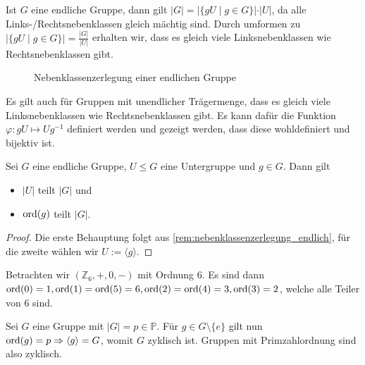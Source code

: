 \begin{remark}\label{rem:nebenklassenzerlegung_endlich}
    Ist $G$ eine endliche Gruppe, dann gilt $\vert G \vert = \vert \{gU \mid g \in G\} \vert \cdot \vert U \vert$, da alle Links-/Rechtsnebenklassen gleich mächtig sind. Durch umformen zu $\vert \{gU \mid g \in G\} \vert = \frac{\vert G \vert}{\vert U \vert}$ erhalten wir, dass es gleich viele Linksnebenklassen wie Rechtsnebenklassen gibt.

    \begin{figure}[H]
        \centering
        \caption{Nebenklassenzerlegung einer endlichen Gruppe}
    \end{figure}
\end{remark}

\begin{remark}
    Es gilt auch für Gruppen mit unendlicher Trägermenge, dass es gleich viele Linksnebenklassen wie Rechtsnebenklassen gibt. Es kann dafür die Funktion $\varphi: gU \mapsto Ug^{-1}$ definiert werden und gezeigt werden, dass diese wohldefiniert und bijektiv ist.
\end{remark}

\begin{theorem}[Lagrange]
    Sei $G$ eine endliche Gruppe, $U \le G$ eine Untergruppe und $g \in G$. Dann gilt
    \begin{itemize}[topsep=0cm, label={--}]
        \item $\vert U \vert$ teilt $\vert G \vert$ und
        \item $\operatorname{ord}(g)$ teilt $\vert G \vert $.
    \end{itemize}
\end{theorem}
\begin{proof}
    Die erste Behauptung folgt aus \cref{rem:nebenklassenzerlegung_endlich}, für die zweite wählen wir $U := \langle g \rangle$.
\end{proof}

\begin{example}
    Betrachten wir $(\mathbb{Z}_6, +, 0, -)$ mit Ordnung 6. Es sind dann $\operatorname{ord}(0) = 1, \operatorname{ord}(1) = \operatorname{ord}(5) = 6, \operatorname{ord}(2) = \operatorname{ord}(4) = 3, \operatorname{ord}(3) = 2$, welche alle Teiler von 6 sind.

    Sei $G$ eine Gruppe mit $\vert G \vert = p \in \mathbb{P}$. Für $g \in G\setminus\{e\}$ gilt nun $\operatorname{ord}(g) = p \Rightarrow \langle g \rangle = G$, womit $G$ zyklisch ist. Gruppen mit Primzahlordnung sind also zyklisch.
\end{example}

